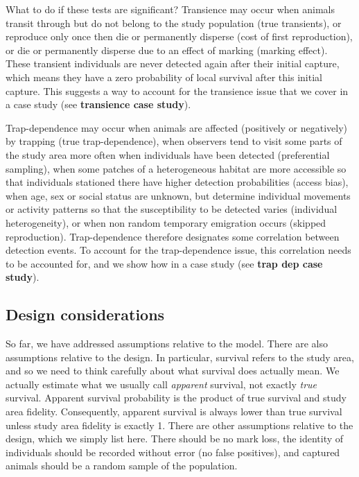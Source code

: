 \documentclass[
  12pt,
]{krantz}
\begin{document}
What to do if these tests are significant? Transience may occur when animals transit through but do not belong to the study population (true transients), or reproduce only once then die or permanently disperse (cost of first reproduction), or die or permanently disperse due to an effect of marking (marking effect). These transient individuals are never detected again after their initial capture, which means they have a zero probability of local survival after this initial capture. This suggests a way to account for the transience issue that we cover in a case study (see \textbf{transience case study}).

Trap-dependence may occur when animals are affected (positively or negatively) by trapping (true trap-dependence), when observers tend to visit some parts of the study area more often when individuals have been detected (preferential sampling), when some patches of a heterogeneous habitat are more accessible so that individuals stationed there have higher detection probabilities (access bias), when age, sex or social status are unknown, but determine individual movements or activity patterns so that the susceptibility to be detected varies (individual heterogeneity), or when non random temporary emigration occurs (skipped reproduction). Trap-dependence therefore designates some correlation between detection events. To account for the trap-dependence issue, this correlation needs to be accounted for, and we show how in a case study (see \textbf{trap dep case study}).

\hypertarget{design-considerations}{%
\subsection{Design considerations}\label{design-considerations}}

So far, we have addressed assumptions relative to the model. There are also assumptions relative to the design. In particular, survival refers to the study area, and so we need to think carefully about what survival does actually mean. We actually estimate what we usually call \emph{apparent} survival, not exactly \emph{true} survival. Apparent survival probability is the product of true survival and study area fidelity. Consequently, apparent survival is always lower than true survival unless study area fidelity is exactly 1.
There are other assumptions relative to the design, which we simply list here. There should be no mark loss, the identity of individuals should be recorded without error (no false positives), and captured animals should be a random sample of the population.
\end{document}

